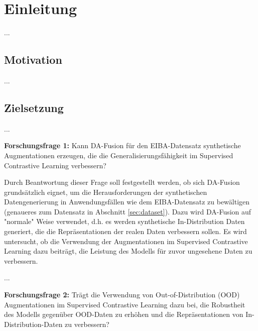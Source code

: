 \chapter{Einleitung} \label{ch:intro}

...

\section{Motivation} \label{sec:motivation}

...

\section{Zielsetzung} \label{sec:goal}

...



\textbf{Forschungsfrage 1:} Kann DA-Fusion für den EIBA-Datensatz synthetische Augmentationen erzeugen, die die Generalisierungsfähigkeit im Supervised Contrastive Learning verbessern?

Durch Beantwortung dieser Frage soll festgestellt werden, ob sich DA-Fusion grundsätzlich eignet, um die Herausforderungen der synthetischen Datengenerierung in Anwendungsfällen wie dem EIBA-Datensatz zu bewältigen (genaueres zum Datensatz in Abschnitt \ref{sec:dataset}). Dazu wird DA-Fusion auf "normale" Weise verwendet, d.h. es werden synthetische In-Distribution Daten generiert, die die Repräsentationen der realen Daten verbessern sollen. Es wird untersucht, ob die Verwendung der Augmentationen im Supervised Contrastive Learning dazu beiträgt, die Leistung des Modells für zuvor ungesehene Daten zu verbessern.

...

\textbf{Forschungsfrage 2:} Trägt die Verwendung von Out-of-Distribution (OOD) Augmentationen im Supervised Contrastive Learning dazu bei, die Robustheit des Modells gegenüber OOD-Daten zu erhöhen und die Repräsentationen von In-Distribution-Daten zu verbessern?

